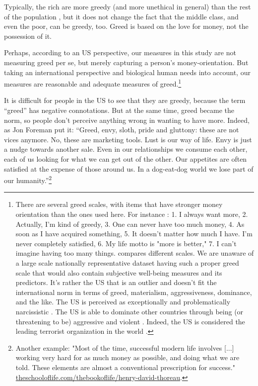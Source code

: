 \documentclass[10pt, letterpaper]{article}
\begin{document}
\begin{spacing}{1.8}
Typically, the rich are more greedy (and more unethical in general) than the rest of the population \citep{piff17,piff14,piff12,piff10,kraus09}, but it does
not change the fact that the middle class, and even the poor, can be greedy, too. Greed is based on the love for money, not the possession of it. 
  

Perhaps, according to an US perspective, our measures in this study are not measuring greed per se, but merely capturing a person's money-orientation. %
But taking an international perspective and biological human needs  \citep[as per][]{veenhoven14b} into account, our measures are reasonable and adequate measures of greed.\footnote{{There are several greed scales, with items that have
  stronger money orientation than the ones used here. For instance
  \citet{seuntjens15}: 1. I always want more, 2. Actually, I'm kind of greedy,
  3. One can never have too much money, 4. As soon as I have acquired something,
  5. It doesn't matter how much I have. I'm never completely satisfied, 6. My
  life motto is "more is better," 7. I can't imagine having too many things. \citet{mussel18} compares different scales.  %
} We are unaware of a large scale nationally representative dataset having such
a proper greed scale that would also contain subjective well-being measures and
its predictors. It's rather the US that is an outlier and doesn't fit the international norm in terms of greed, materialism, aggressiveness, dominance, and the like. 
%
The US is perceived as exceptionally and problematically narcissistic \citep{miller15}.
The US %
is able to dominate other countries through being (or threatening to be) aggressive and violent \citep[e.g.,][]{pratto08}. %
 Indeed, the US is considered the leading terrorist organization in the world
 \citep{truthout14nov3}. }

It is difficult for people in the US to see that they are greedy, because the term ``greed''
has negative connotations. But at the same time, greed became the norm, so people don't perceive anything wrong in wanting to have more. Indeed, as Jon Foreman put it:
``Greed, envy, sloth, pride and gluttony: these are not vices anymore. No, these
are marketing tools. Lust is our way of life. Envy is just a nudge towards
another sale. Even in our relationships we consume each other, each of us
looking for what we can get out of the other. Our appetites are often satisfied
at the expense of those around us. In a dog-eat-dog world we lose part of our
humanity.''\footnote{Another example: "Most of the time, successful modern life involves [...] working very hard for as much money as possible, and doing what we are told. These elements are almost a conventional prescription for success." \url{theschooloflife.com/thebookoflife/henry-david-thoreau}.}


\end{spacing}
\end{document}
